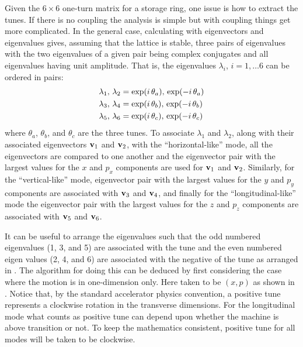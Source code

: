 Given the $6 \times 6$ one-turn matrix for a storage ring, one issue is how to extract the tunes. If
there is no coupling the analysis is simple but with coupling things get more complicated. In the
general case, calculating with eigenvectors and eigenvalues gives, assuming that the lattice is
stable, three pairs of eigenvalues with the two eigenvalues of a given pair being complex
conjugates and all eigenvalues having unit amplitude. That is, the eigenvalues $\lambda_i$, $i =
1, \ldots 6$ can be ordered in pairs:
\begin{align}
  \lambda_1, \, \lambda_2 &= \exp(i \, \theta_a), \, \exp(-i \, \theta_a) \nonumber \\
  \lambda_3, \, \lambda_4 &= \exp(i \, \theta_b), \, \exp(-i \, \theta_b) \label{lleit} \\
  \lambda_5, \, \lambda_6 &= \exp(i \, \theta_c), \, \exp(-i \, \theta_c) \nonumber
  \label{llee}
\end{align}
where $\theta_a$, $\theta_b$, and $\theta_c$ are the three tunes. To associate $\lambda_1$ and
$\lambda_2$, along with their associated eigenvectors ${\bf v}_1$ and ${\bf v}_2$, with the
``horizontal-like'' mode, all the eigenvectors are compared to one another and the eigenvector pair
with the largest values for the $x$ and $p_x$ components are used for ${\bf v}_1$ and ${\bf v}_2$.
Similarly, for the ``vertical-like'' mode, eigenvector pair with the largest values for the $y$ and
$p_y$ components are associated with ${\bf v}_3$ and ${\bf v}_4$, and finally for the ``longitudinal-like''
mode the eigenvector pair with the largest values for the $z$ and $p_z$ components are associated
with ${\bf v}_5$ and ${\bf v}_6$.

It can be useful to arrange the eigenvalues such that the odd numbered eigenvalues (1, 3, and 5) are
associated with the tune and the even numbered eigen values (2, 4, and 6) are associated with the
negative of the tune as arranged in . The algorithm for doing this can be deduced by first
considering the case where the motion is in one-dimension only. Here taken to be $(x, p)$ as shown
in . Notice that, by the standard accelerator physics convention, a positive tune
represents a clockwise rotation in the transverse dimensions. For the longitudinal mode what counts
as positive tune can depend upon whether the machine is above transition or not. To keep the
mathematics consistent, positive tune for all modes will be taken to be clockwise.

